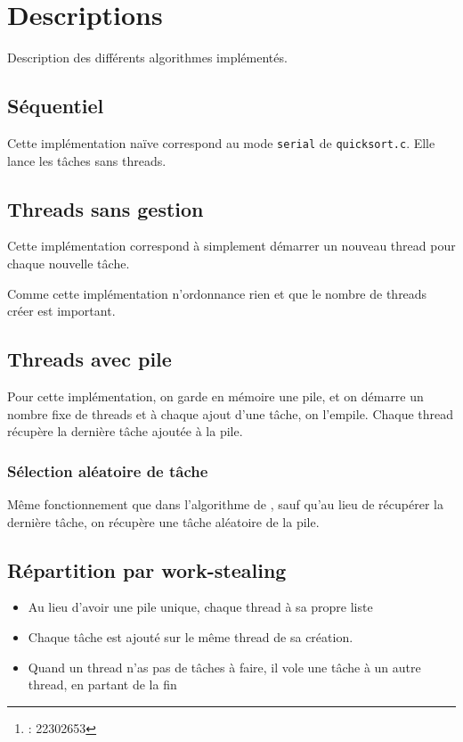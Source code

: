 \documentclass{article}
\title{\docTitle}
\author{\href{\authorMail}{\anri}\thanks{\anri : 22302653}}
\date{Année universitaire 2023-2024}
\newcommand{\docref}[1]{\textit{\nameref{#1}}} %
\begin{document}
\maketitle
\flushbottom
\tableofcontents
\clearpage

\section{Descriptions}
Description des différents algorithmes implémentés.

\subsection{Séquentiel}
Cette implémentation naïve correspond au mode \texttt{serial}
de \texttt{quicksort.c}. Elle lance les tâches sans threads.

\subsection[Threads sans gestion]{Threads sans gestion}
Cette implémentation correspond à simplement démarrer un nouveau thread
pour chaque nouvelle tâche.

Comme cette implémentation n'ordonnance rien et que le nombre de threads créer
est important.

\subsection{Threads avec pile}\label{desc:th_pile}
Pour cette implémentation, on garde en mémoire une pile,
et on démarre un nombre fixe de threads et à chaque ajout d'une tâche,
on l'empile. Chaque thread récupère la dernière tâche ajoutée à la pile.

\subsubsection{Sélection aléatoire de tâche}
Même fonctionnement que dans l'algorithme de \docref{desc:th_pile}, sauf
qu'au lieu de récupérer la dernière tâche, on récupère une tâche
aléatoire de la pile.

\subsection{Répartition par work-stealing}\label{desc:ws}
\begin{itemize}
  \item Au lieu d'avoir une pile unique, chaque thread à sa propre liste
  \item Chaque tâche est ajouté sur le même thread de sa création.
  \item Quand un thread n'as pas de tâches à faire, il vole une tâche à un autre
        thread, en partant de la fin
\end{itemize}
\end{document}
